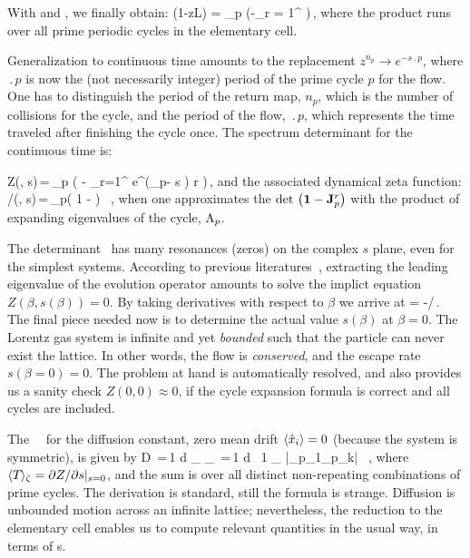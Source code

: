 With  and , we finally
obtain:
\beq
\det(1-z{\cal L}) = \prod_p \exp\left(-\sum_{r =
1}^{\infty}
\right)\,,
\label{eq-det-disc}
\eeq
where the product runs over all prime periodic cycles in the
elementary cell.

Generalization to continuous time amounts to the
replacement $ z^{n_p} \rightarrow e^{-s \period{p}} $, where
$\period{p}$ is now the (not necessarily integer) %
period of the prime cycle $p$ for the flow. One has to distinguish the
period of the return map, $n_p$, which is the number of collisions for
the cycle, and the period of the flow, $\period{p}$, which represents
the time traveled after finishing the cycle once. The spectrum
determinant for the continuous time is:

\beq
Z(\beta, s)\,=\,\prod_{p\in\PP} \exp \left( - {
 \sum_{r=1}^
 { e^{(\beta \cdot \hn_p- s ) r } %
  }
 } \right)\,,
\label{eq-det-cont}
\eeq
and the associated dynamical zeta function:
/\zeta(\beta, s)\,=\,\prod_{p}\left( 1 -  \right) ~,
\label{eq-zeta-cont}
\eeq
when one approximates the $\det\left( {\bf 1}-{\bf J}_p^{r} \right) $ with
the product of expanding eigenvalues of the cycle, $\ExpaEig_p$. 

The determinant~ has many resonances
(zeros) on the complex $s$ plane, even for the simplest systems.
According to previous literatures~, extracting the leading
eigenvalue of the evolution operator amounts to solve the implict
equation $Z(\beta, s(\beta)) = 0$. By taking derivatives with respect
to $\beta$ we arrive at
\beq
{} = -/\,.
\eeq
The final piece needed now is to determine the actual value $s(\beta)$
at $\beta = 0$. The Lorentz gas system is infinite and yet
\emph{bounded} such that the particle can never exist the lattice.
In other words, the flow is \emph{conserved}, and the escape rate
$s(\beta = 0) = 0$. The problem at hand is automatically resolved, and
also provides us a sanity check $Z(0, 0)\approx 0$, if the cycle
expansion formula is correct and all cycles are included.

The \dzeta\ \cycForm\ for the diffusion constant, zero mean drift
$ \expct{ \hat{x}_i } = 0 $ (because the system is symmetric), is
given by
 \beq
 D \,=\,{1  d} { _\zeta \over
 \expct{\period{}}_\zeta } \,=\,{1  d } \, {1 \over
 \expct{\period{}}_\zeta} \sumprime {} {|\ExpaEig_{p_1}\cdots \ExpaEig_{p_k}|} \, ,
\label{eq-diff-ec}
\eeq
where $\expct{\period{}}_\zeta = \partial Z/\partial s\vert_{s = 0}$,
and the sum is over all distinct non-repeating combinations of prime
cycles. The derivation is standard, still the formula is strange.
Diffusion is unbounded motion across an infinite lattice;
nevertheless, the reduction to the elementary cell enables us to
compute relevant quantities in the usual way, in terms of \po s.
